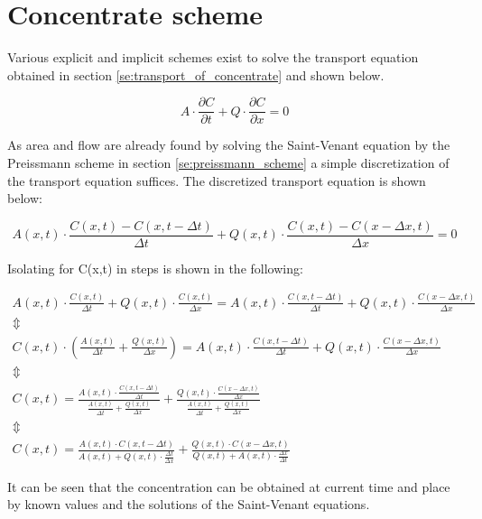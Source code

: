 \section{Concentrate scheme}\label{sec:concentrate}

Various explicit and implicit schemes exist to solve the transport equation obtained in section \ref{se:transport_of_concentrate} and shown below.

\begin{equation}
A \cdot \frac{\partial C}{\partial t} + Q \cdot \frac{\partial C}{\partial x} = 0
\label{eq:transport_sim}
\end{equation}

As area and flow are already found by solving the Saint-Venant equation by the Preissmann scheme in section \ref{se:preissmann_scheme} a simple discretization of the transport equation suffices.
The discretized transport equation is shown below:

\begin{equation}
	A(x,t) \cdot \frac{C(x,t) - C(x,t-\Delta t)}{\Delta t} + Q(x,t) \cdot \frac{C(x,t)-C(x-\Delta x,t)}{\Delta x} = 0
\end{equation}

Isolating for C(x,t) in steps is shown in the following:

\begin{equation}
\begin{array}{l}
	A(x,t) \cdot \frac{C(x,t)}{\Delta t} + Q(x,t) \cdot \frac{C(x,t)}{\Delta x} = A(x,t) \cdot \frac{C(x,t-\Delta t)}{\Delta t} + Q(x,t) \cdot \frac{C(x-\Delta x,t)}{\Delta x} \\

	\Updownarrow \\

C(x,t) \cdot \left( \frac{A(x,t)}{\Delta t} + \frac{Q(x,t)}{\Delta x} \right) = A(x,t) \cdot \frac{C(x,t-\Delta t)}{\Delta t} + Q(x,t) \cdot \frac{C(x-\Delta x,t)}{\Delta x} \\

\Updownarrow \\

C(x,t) = \frac{ A(x,t) \cdot \frac{C(x,t-\Delta t)}{\Delta t}}{\frac{A(x,t)}{\Delta t} + \frac{Q(x,t)}{\Delta x}}   +   \frac{ Q(x,t) \cdot \frac{C(x-\Delta x,t)}{\Delta x}}{\frac{A(x,t)}{\Delta t} + \frac{Q(x,t)}{\Delta x}} \\

\Updownarrow \\

C(x,t) = \frac{ A(x,t) \cdot C(x,t-\Delta t) }{ A(x,t)+Q(x,t) \cdot \frac{\Delta t}{ \Delta x} } + \frac{Q(x,t) \cdot C(x-\Delta x,t)}{Q(x,t)+A(x,t)\cdot \frac{\Delta x}{\Delta t}}

\end{array}	
\end{equation}

It can be seen that the concentration can be obtained at current time and place by known values and the solutions of the Saint-Venant equations.
